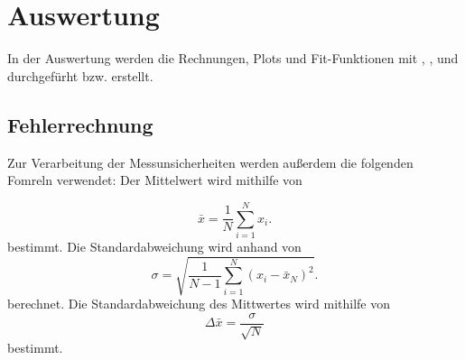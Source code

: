 \section{Auswertung}
\label{sec:Auswertung}
In der Auswertung werden die Rechnungen, Plots und Fit-Funktionen mit \cite{matplotlib}, \cite{numpy}, \cite{scipy} und \cite{uncertainties} durchgefürht bzw. erstellt.
\subsection{Fehlerrechnung}
\label{sec:fehlerrechnung}
Zur Verarbeitung der Messunsicherheiten werden außerdem die folgenden Fomreln verwendet: 
Der Mittelwert wird mithilfe von

\begin{equation}
\bar{x} = \frac{1}{N} \sum_{i=1}^{N} x_i.
\label{eqn:mittelwert}
\end{equation}
bestimmt.
Die Standardabweichung wird anhand von
\begin{equation}
\sigma = \sqrt{\frac{1}{N - 1} \sum_{i=1}^{N} \left( x_i - \bar{x}_N \right)^2}.
\label{eqn:standardabweichung}
\end{equation}
berechnet.
Die Standardabweichung des Mittwertes wird mithilfe von 
\begin{equation}
\Delta \bar{x} = \frac{\sigma}{\sqrt{N}}
\label{eqn:standardmittelwert}
\end{equation}
bestimmt.









